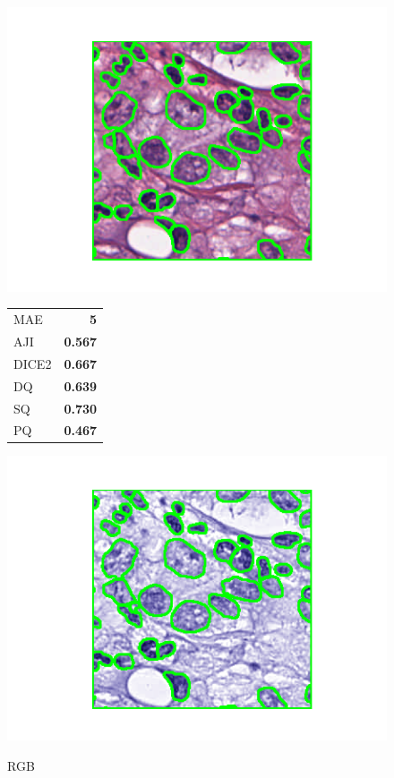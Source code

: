 \documentclass[target=bach,aauheader=,style=]{thud}
\begin{document}
\begin{figure}[ht]
\centering

\begin{minipage}{0.48\textwidth}\centering
  \includegraphics[width=\linewidth]{imgs/qualitative/medium/RGB/contour_img.png}\\[-1ex]
  \footnotesize
  \begin{tabular}{@{}lr@{}}
   MAE & \textbf{5}\\ AJI & \textbf{0.567}\\ DICE2 & \textbf{0.667}\\
   DQ & \textbf{0.639}\\ SQ & \textbf{0.730}\\ PQ & \textbf{0.467}
  \end{tabular}
  \caption*{RGB}
\end{minipage}\hfill
\begin{minipage}{0.48\textwidth}\centering
  \includegraphics[width=\linewidth]{imgs/qualitative/medium/HE/contour_img.png}\\[-1ex]

\end{minipage}
\end{figure}
\end{document}
